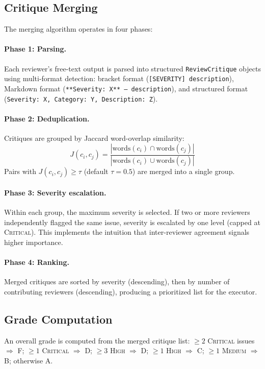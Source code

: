\documentclass[10pt]{article}
\begin{document}
\subsection{Critique Merging}
\label{sec:merge}

The merging algorithm operates in four phases:

\paragraph{Phase 1: Parsing.}
Each reviewer's free-text output is parsed into structured \texttt{ReviewCritique} objects using multi-format detection: bracket format (\texttt{[SEVERITY] description}), Markdown format (\texttt{**Severity: X** --- description}), and structured format (\texttt{Severity: X, Category: Y, Description: Z}).

\paragraph{Phase 2: Deduplication.}
Critiques are grouped by Jaccard word-overlap similarity:
\begin{equation}
J(c_i, c_j) = \frac{|\text{words}(c_i) \cap \text{words}(c_j)|}{|\text{words}(c_i) \cup \text{words}(c_j)|}
\end{equation}
Pairs with $J(c_i, c_j) \geq \tau$ (default $\tau{=}0.5$) are merged into a single group.

\paragraph{Phase 3: Severity escalation.}
Within each group, the maximum severity is selected. If two or more reviewers independently flagged the same issue, severity is escalated by one level (capped at \textsc{Critical}). This implements the intuition that inter-reviewer agreement signals higher importance.

\paragraph{Phase 4: Ranking.}
Merged critiques are sorted by severity (descending), then by number of contributing reviewers (descending), producing a prioritized list for the executor.

\subsection{Grade Computation}
An overall grade is computed from the merged critique list: $\geq 2$ \textsc{Critical} issues $\Rightarrow$ F; $\geq 1$ \textsc{Critical} $\Rightarrow$ D; $\geq 3$ \textsc{High} $\Rightarrow$ D; $\geq 1$ \textsc{High} $\Rightarrow$ C; $\geq 1$ \textsc{Medium} $\Rightarrow$ B; otherwise A.
\end{document}
